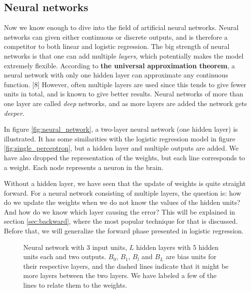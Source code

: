 \subsection{Neural networks} \label{sec:neural_network}
Now we know enough to dive into the field of artificial neural networks. Neural networks can given either continuous or discrete outputs, and is therefore a competitor to both linear and logistic regression. The big strength of neural networks is that one can add multiple \textit{layers}, which potentially makes the model extremely flexible. According to \textbf{the universal approximation theorem}, a neural network with only one hidden layer can approximate any continuous function. [8] However, often multiple layers are used since this tends to give fewer units in total, and is known to give better results. Neural networks of more than one layer are called \textit{deep} networks, and as more layers are added the network gets \textit{deeper}.

In figure \eqref{fig:neural_network}, a two-layer neural network (one hidden layer) is illustrated. It has some similarities with the logistic regression model in figure \eqref{fig:single_perceptron}, but a hidden layer and multiple outputs are added. We have also dropped the representation of the weights, but each line corresponds to a weight. Each node represents a neuron in the brain.

Without a hidden layer, we have seen that the update of weights is quite straight forward. For a neural network consisting of multiple layers, the question is: how do we update the weights when we do not know the values of the hidden units? And how do we know which layer causing the error? This will be explained in section \ref{sec:backward}, where the most popular technique for that is discussed. Before that, we will generalize the forward phase presented in logistic regression.

\begin{figure}
	\centering
	
	\caption{Neural network with 3 input units, $L$ hidden layers with 5 hidden units each and two outputs. $B_0$, $B_1$, $B_l$ and $B_L$ are bias units for their respective layers, and the dashed lines indicate that it might be more layers between the two layers. We have labeled a few of the lines to relate them to the weights. }
	\label{fig:neural_network}
\end{figure}

